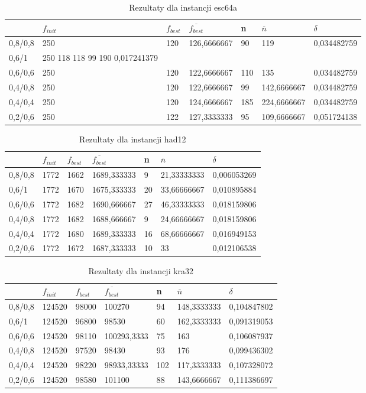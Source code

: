 \begin{table}[H]
\label{T3_esc64a}
\begin{tabular}{l l l l l l l}
\hline
 & $f_{init}$ & $f_{best}$ & $\overline{f_{best}}$ & n & $\overline{n}$ & $\delta$ \\
\hline
0,8/0,8 & 250 & 120 & 126,6666667 & 90 & 119 & 0,034482759\\
0,6/1 & 250	118	118	99	190	0,017241379\\
0,6/0,6 & 250 & 120 & 122,6666667 & 110 & 135 & 0,034482759\\
0,4/0,8 & 250 & 120 & 122,6666667 & 99 & 142,6666667 & 0,034482759\\
0,4/0,4 & 250 & 120 & 124,6666667 & 185 & 224,6666667 & 0,034482759\\
0,2/0,6 & 250 & 122 & 127,3333333 & 95 & 109,6666667 & 0,051724138\\
\hline
\end{tabular}
\caption{Rezultaty dla instancji esc64a}
\end{table}

\begin{table}[H]
\label{T3_had12}
\begin{tabular}{l l l l l l l}
\hline
 & $f_{init}$ & $f_{best}$ & $\overline{f_{best}}$ & n & $\overline{n}$ & $\delta$ \\
\hline
0,8/0,8 & 1772 & 1662 & 1689,333333 & 9 & 21,33333333 & 0,006053269\\
0,6/1 & 1772 & 1670 & 1675,333333 & 20 & 33,66666667 & 0,010895884\\
0,6/0,6 & 1772 & 1682 & 1690,666667 & 27 & 46,33333333 & 0,018159806\\
0,4/0,8 & 1772 & 1682 & 1688,666667 & 9 & 24,66666667 & 0,018159806\\
0,4/0,4 & 1772 & 1680 & 1689,333333 & 16 & 68,66666667 & 0,016949153\\
0,2/0,6 & 1772 & 1672 & 1687,333333 & 10 & 33 & 0,012106538\\
\hline
\end{tabular}
\caption{Rezultaty dla instancji had12}
\end{table}

\begin{table}[H]
\label{T3_kra32}
\begin{tabular}{l l l l l l l}
\hline
 & $f_{init}$ & $f_{best}$ & $\overline{f_{best}}$ & n & $\overline{n}$ & $\delta$ \\
\hline
0,8/0,8 & 124520 & 98000 & 100270 & 94 & 148,3333333 & 0,104847802\\
0,6/1 & 124520 & 96800 & 98530 & 60 & 162,3333333 & 0,091319053\\
0,6/0,6 & 124520 & 98110 & 100293,3333 & 75 & 163 & 0,106087937\\
0,4/0,8 & 124520 & 97520 & 98430 & 93 & 176 & 0,099436302\\
0,4/0,4 & 124520 & 98220 & 98933,33333 & 102 & 117,3333333 & 0,107328072\\
0,2/0,6 & 124520 & 98580 & 101100 & 88 & 143,6666667 & 0,111386697\\

\hline
\end{tabular}
\caption{Rezultaty dla instancji kra32}
\end{table}


